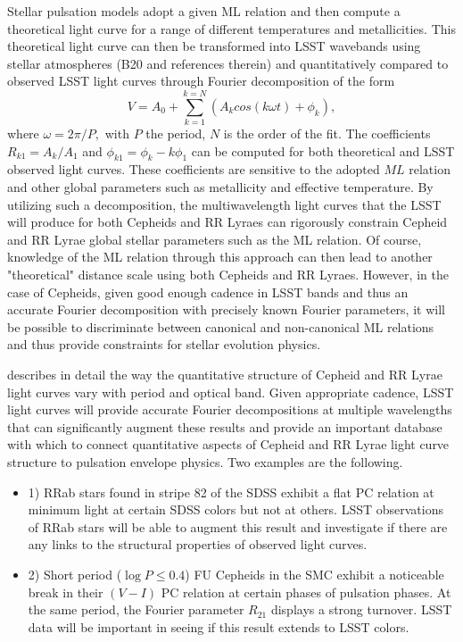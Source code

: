 Stellar pulsation models adopt a given ML relation and then compute a
theoretical light curve for a range of different temperatures and
metallicities. This theoretical light curve can then be transformed into LSST
wavebands using stellar atmospheres (B20 and references therein) and
quantitatively compared to observed LSST light curves through Fourier
decomposition of the form
$$V = A_0 + \sum_{k=1}^{k=N}(A_k cos(k\omega t) + {\phi}_k),$$
where $\omega = 2\pi/P,$ with $P$ the period, $N$ is the order of the fit. The
coefficients $R_{k1}=A_k/A_1$ and ${\phi}_{k1}={\phi}_k - k{\phi}_1$ can be
computed for both theoretical and LSST observed light curves. These
coefficients are sensitive to the adopted $ML$ relation and other global
parameters such as metallicity and effective temperature.  By utilizing such a
decomposition, the multiwavelength light curves that the LSST will produce for
both Cepheids and RR Lyraes can rigorously constrain Cepheid and RR Lyrae
global stellar parameters such as the ML relation. Of course, knowledge of the
ML relation through this approach can then lead to another "theoretical"
distance scale using both Cepheids and RR Lyraes.  However, in the case of
Cepheids, given good enough cadence in LSST bands and thus an accurate Fourier
decomposition with precisely known Fourier parameters, it will be possible to
discriminate between canonical and non-canonical ML relations and thus provide
constraints for stellar evolution physics.

\citet{2014MNRAS.445.2655B} describes in detail the way the quantitative structure of
Cepheid and RR Lyrae light curves vary with period and optical band. Given
appropriate cadence, LSST light curves will provide accurate Fourier
decompositions at multiple wavelengths that can significantly augment these
results and provide an important database with which to connect quantitative
aspects of Cepheid and RR Lyrae light curve structure to pulsation envelope
physics. Two examples are the following.
\begin{itemize}
\item{1)} RRab stars found in stripe 82 of the
SDSS exhibit a flat PC relation at minimum light at certain SDSS colors but not at others. LSST observations of RRab stars will be able
to augment this result and investigate if there are any links to the structural properties of observed light curves.
\item{2)} Short period ($\log P \le 0.4$) FU Cepheids in the SMC exhibit a noticeable break in their $(V-I)$ PC relation at certain phases of pulsation
phases. At the same period, the Fourier parameter $R_{21}$ displays a strong turnover. LSST data will be important in seeing if this result extends 
to LSST colors.
\end{itemize}

